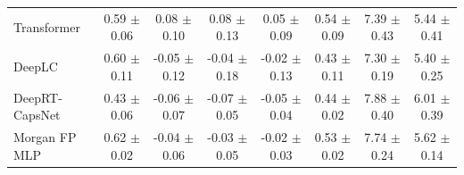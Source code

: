 \begin{table}[htbp]
\begin{tabular}{lccccccc}
    Transformer & 0.59 $\pm$ 0.06 & 0.08 $\pm$ 0.10 & 0.08 $\pm$ 0.13 & 0.05 $\pm$ 0.09 & 0.54 $\pm$ 0.09 & 7.39 $\pm$ 0.43 & 5.44 $\pm$ 0.41 \\
    DeepLC & 0.60 $\pm$ 0.11 & -0.05 $\pm$ 0.12 & -0.04 $\pm$ 0.18 & -0.02 $\pm$ 0.13 & 0.43 $\pm$ 0.11 & 7.30 $\pm$ 0.19 & 5.40 $\pm$ 0.25 \\
    DeepRT-CapsNet & 0.43 $\pm$ 0.06 & -0.06 $\pm$ 0.07 & -0.07 $\pm$ 0.05 & -0.05 $\pm$ 0.04 & 0.44 $\pm$ 0.02 & 7.88 $\pm$ 0.40 & 6.01 $\pm$ 0.39 \\
    Morgan FP MLP & 0.62 $\pm$ 0.02 & -0.04 $\pm$ 0.06 & -0.03 $\pm$ 0.05 & -0.02 $\pm$ 0.03 & 0.53 $\pm$ 0.02 & 7.74 $\pm$ 0.24 & 5.62 $\pm$ 0.14 \\
    \bottomrule
  \end{tabular}
\end{table}
